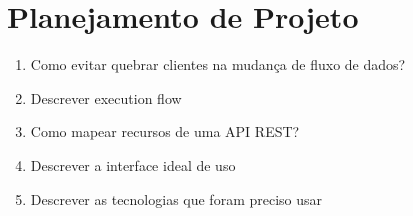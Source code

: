 \section{Planejamento de Projeto}


\begin{enumerate}
\item Como evitar quebrar clientes na mudança de fluxo de dados?
\item Descrever execution flow
\item Como mapear recursos de uma API REST?
\item Descrever a interface ideal de uso
\item Descrever as tecnologias que foram preciso usar
\end{enumerate}